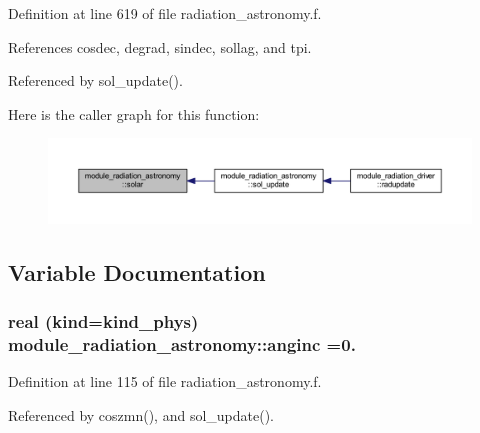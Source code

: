 Definition at line 619 of file radiation\+\_\+astronomy.\+f.



References cosdec, degrad, sindec, sollag, and tpi.



Referenced by sol\+\_\+update().



Here is the caller graph for this function\+:
\nopagebreak
\begin{figure}[H]
\begin{center}
\leavevmode
\includegraphics[width=350pt]{group__module__radiation__astronomy_gab295ff320cb8720fde46e80ee6573f08_icgraph}
\end{center}
\end{figure}




\subsection{Variable Documentation}
\subsubsection[{\texorpdfstring{anginc}{anginc}}]{\setlength{\rightskip}{0pt plus 5cm}real (kind=kind\+\_\+phys) module\+\_\+radiation\+\_\+astronomy\+::anginc =0.\hspace{0.3cm}{\ttfamily [private]}}\hypertarget{group__module__radiation__astronomy_ga723159a44491e4ae974128123a1e8dcd}{}\label{group__module__radiation__astronomy_ga723159a44491e4ae974128123a1e8dcd}


Definition at line 115 of file radiation\+\_\+astronomy.\+f.



Referenced by coszmn(), and sol\+\_\+update().

